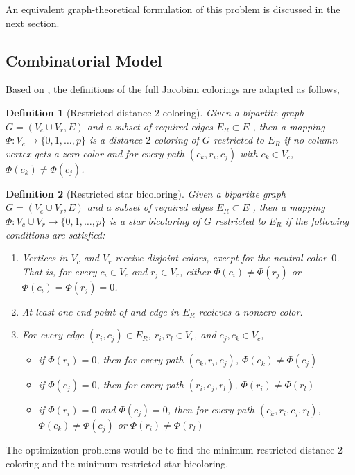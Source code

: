 \documentclass[12pt, oneside]{book}
\newtheorem{definition}{Definition}
\begin{document}
An equivalent graph-theoretical formulation of this problem is discussed in the next
section.

\subsection{Combinatorial Model}
Based on \cite{Gebremedhin05whatcolor,Lulfesmann2012Fap}, the definitions
of the full Jacobian colorings are adapted as follows,
\begin{definition}[Restricted distance-$2$ coloring]\label{d.coloring}
Given a bipartite graph $G=(V_c\cup V_r, E)$ and a subset of required edges
$E_R\subset E$ , then a mapping $\Phi:V_c \to
\{0,1,\dots ,p\}$ is a distance-$2$ coloring
of $G$ restricted to $E_R$ if no column vertex gets a zero color and
for every path $(c_k,r_i,c_j)$ with $c_k\in V_c$, 
$\Phi(c_k) \neq \Phi(c_j)$.
\end{definition}
\begin{definition}[Restricted star bicoloring]\label{d.coloring}
Given a bipartite graph $G=(V_c\cup V_r, E)$ and a subset of required edges
$E_R\subset E$ , then a mapping $\Phi:V_c \cup V_r \to
\{0,1,\dots ,p\}$ is a star bicoloring of $G$ restricted to $E_R$
if the following conditions are satisfied:
\begin{enumerate}
\item Vertices in $V_c$ and $V_r$ receive disjoint colors, except for the neutral color~$0$. That
    is, for every $c_i \in V_c$ and $r_j \in V_r$, either $\Phi(c_i) \neq \Phi(r_j)$ or
    $\Phi(c_i)=\Phi(r_j)=0$.

\item At least one end point of and edge in $E_R$ recieves a nonzero color. 
\item For every edge $(r_i,c_j)\in E_R$, $r_i, r_l\in V_r$, and 
$c_j, c_k\in V_c$,
\begin{itemize}
\item if $\Phi (r_i) = 0$, then for every path $(c_k,r_i,c_j)$, $\Phi (c_k)\neq \Phi (c_j)$
\item if $\Phi (c_j) = 0$, then for every path $(r_i,c_j,r_l)$, $\Phi (r_i)\neq \Phi (r_l)$
\item if $\Phi (r_i) = 0$ and $\Phi (c_j) = 0$, then for every path $(c_k,r_i,c_j,r_l)$, 
$\Phi (c_k)\neq \Phi (c_j)$ or $\Phi (r_i)\neq \Phi (r_l)$
\end{itemize} 
\end{enumerate}
\end{definition}

The optimization problems would be to 
find the minimum restricted distance-$2$ coloring
and the minimum restricted star bicoloring.
\end{document}
